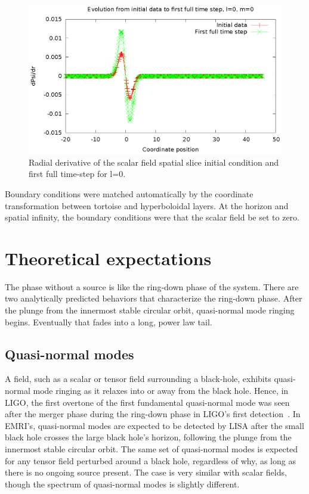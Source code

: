 \begin{figure}
  \includegraphics{phi1dl0}
  \caption{Radial derivative of the scalar field spatial slice initial condition and first full time-step for l=0.}
  \label{phi0}
\end{figure}

Boundary conditions were matched automatically by the coordinate transformation between tortoise and hyperboloidal layers. At the horizon and spatial infinity, the boundary conditions were that the scalar field be set to zero. 

\section{Theoretical expectations}

The phase without a source is like the ring-down phase of the system. There are two analytically predicted behaviors that characterize the ring-down phase. After the plunge from the innermost stable circular orbit, quasi-normal mode ringing begins. Eventually that fades into a long, power law tail.

\subsection{Quasi-normal modes}
A field, such as a scalar or tensor field surrounding a black-hole, exhibits quasi-normal mode ringing as it relaxes into or away from the black hole.  Hence, in LIGO, the first overtone of the first fundamental quasi-normal mode was seen after the merger phase during the ring-down phase in LIGO's first detection~\cite{LIGO1e}. In EMRI's, quasi-normal modes are expected to be detected by LISA after the small black hole crosses the large black hole's horizon, following the plunge from the innermost stable circular orbit. The same set of quasi-normal modes is expected for any tensor field perturbed around a black hole, regardless of why, as long as there is no ongoing source present. The case is very similar with scalar fields, though the spectrum of quasi-normal modes is slightly different.

